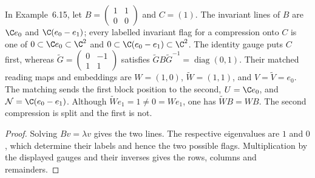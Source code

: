 \begin{lemma}
    \label{lem:asym_example_one_block}
    \leanok
    In Example~6.15, let
    $B=\left(\begin{smallmatrix}1&1\\0&0\end{smallmatrix}\right)$ and
    $C=(1)$. The invariant lines of $B$ are $\C e_0$ and $\C(e_0-e_1)$;
    every labelled invariant flag for a compression onto $C$ is one of
    $0\subset\C e_0\subset\C^2$ and
    $0\subset\C(e_0-e_1)\subset\C^2$.
    The identity gauge puts $C$ first, whereas
    $\widetilde G=\left(\begin{smallmatrix}0&-1\\1&1\end{smallmatrix}\right)$
    satisfies $\widetilde GB\widetilde G^{-1}=\operatorname{diag}(0,1)$.
    Their matched reading maps and embeddings are
    $W=(1,0)$, $\widetilde W=(1,1)$, and $V=\widetilde V=e_0$.
    The matching sends the first block position to the second,
    $U=\C e_0$, and $\mathcal N=\C(e_0-e_1)$.
    Although $\widetilde We_1=1\neq0=We_1$, one has
    $\widetilde WB=WB$. The second compression is split and the first is not.
\end{lemma}

\begin{proof}
    \leanok
    Solving $Bv=\lambda v$ gives the two lines. The respective eigenvalues
    are $1$ and $0$, which determine their labels and hence the two possible
    flags. Multiplication by the displayed gauges and their inverses gives
    the rows, columns and remainders.
\end{proof}

